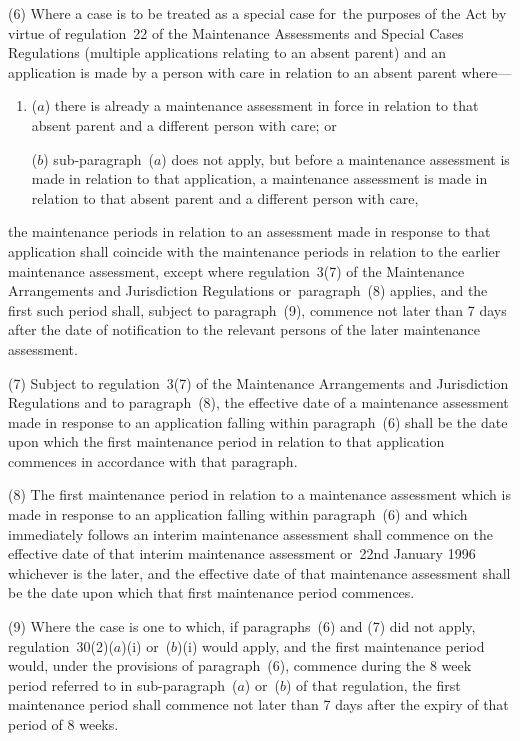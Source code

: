 \documentclass[a4paper,12pt]{article}
\begin{document}
(6) Where a case is to be treated as a special case for~the purposes of the Act by virtue of regulation~22 of the Maintenance Assessments and Special Cases Regulations (multiple applications relating to an absent parent) and an application is made by a person with care in relation to an absent parent where—
\begin{enumerate}\item[]
($a$) there is already a maintenance assessment in force in relation to that absent parent and a different person with care; or

($b$) sub-paragraph~($a$) does not apply, but before a maintenance assessment is made in relation to that application, a maintenance assessment is made in relation to that absent parent and a different person with care,
\end{enumerate}
the maintenance periods in relation to an assessment made in response to that application shall coincide with the maintenance periods in relation to the earlier maintenance assessment, except where regulation~3(7) of the Maintenance Arrangements and Jurisdiction Regulations or~paragraph~(8) applies, and the first such period shall, subject to paragraph~(9), commence not later than 7 days after the date of notification to the relevant persons of the later maintenance assessment.

(7) Subject to regulation~3(7) of the Maintenance Arrangements and Jurisdiction Regulations and to paragraph~(8), the effective date of a maintenance assessment made in response to an application falling within paragraph~(6) shall be the date upon which the first maintenance period in relation to that application commences in accordance with that paragraph.

(8) The first maintenance period in relation to a maintenance assessment which is made in response to an application falling within paragraph~(6) and which immediately follows an interim maintenance assessment shall commence on the effective date of that interim maintenance assessment or~22nd January 1996 whichever is the later, and the effective date of that maintenance assessment shall be the date upon which that first maintenance period commences.

(9) Where the case is one to which, if paragraphs~(6) and (7) did not apply, regulation~30(2)($a$)(i) or~($b$)(i) would apply, and the first maintenance period would, under the provisions of paragraph~(6), commence during the 8 week period referred to in sub-paragraph~($a$) or~($b$) of that regulation, the first maintenance period shall commence not later than 7 days after the expiry of that period of 8 weeks.
\end{document}
